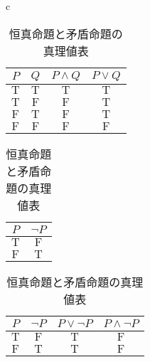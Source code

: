 \begin{table}[htbp]
  \begin{center}
    \begin{tabular}{c}

      \begin{minipage}{0.3\hsize}
        \begin{center}
          \caption{論理和（積）の真理値表}
          \label{fig:論理和（積）の真理値表}
          \begin{tabular}{|c|c|c|c|} \hline
            $P$           & $Q$          & $P \land Q$   & $P \lor Q$    \\ \hline
            $\mathrm{T}$  & $\mathrm{T}$ & $\mathrm{T}$  & $\mathrm{T}$  \\ \hline
            $\mathrm{T} $ & $\mathrm{F}$ & $\mathrm{F}$  & $\mathrm{T}$  \\ \hline
            $\mathrm{F} $ & $\mathrm{T}$ & $\mathrm{F} $ & $\mathrm{T}$  \\  \hline
            $\mathrm{F}$  & $\mathrm{F}$ & $\mathrm{F}$  & $\mathrm{F} $ \\ \hline
          \end{tabular}
        \end{center}
      \end{minipage}

      \begin{minipage}{0.3\hsize}
        \begin{center}
          \caption{否定命題の真理値表}
          \label{fig:否定命題の真理値表}
          \begin{tabular}{|c|c|} \hline
            $P $         & $\lnot P$    \\ \hline
            $\mathrm{T}$ & $\mathrm{F}$ \\ \hline
            $\mathrm{F}$ & $\mathrm{T}$ \\\hline
          \end{tabular}
        \end{center}
      \end{minipage}

      \begin{minipage}{0.3\hsize}
        \begin{center}
          \caption{恒真命題と矛盾命題の真理値表}
          \label{fig:恒真命題と矛盾命題の真理値表}
          \begin{tabular}{|c|c|c|c|} \hline
            $ P$          & $\lnot P$     & $ P \lor \lnot P $ & $P \land \lnot P$ \\ \hline
            $\mathrm{T} $ & $\mathrm{F} $ & $\mathrm{T}$       & $\mathrm{F}$      \\ \hline
            $\mathrm{F} $ & $\mathrm{T}$  & $\mathrm{T}$       & $\mathrm{F}$      \\\hline
          \end{tabular}
        \end{center}
      \end{minipage}
    \end{tabular}
  \end{center}
\end{table}

